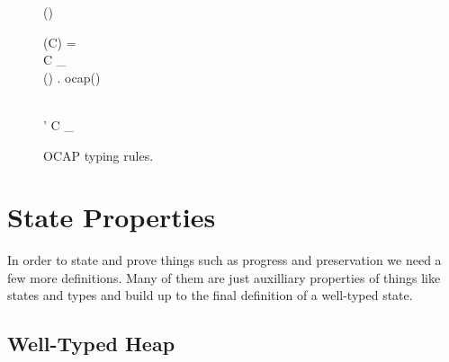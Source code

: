 \begin{figure}
  {\ocap{(\AnyRefType{})}}

  \RuleSpace{}

  {\ocap(\CellType)}

  \RuleSpace{}

  { 
  \classdef(C) =  \\
   \andalso C \vdash_{\ocap}  \\
  \forall () \in {}. \: ocap(\sigma)
  }
  {}

  \RuleSpace{}

  { \\
  \tau' \stof \tau}
  {C \vdash_{\ocap} }
  \caption{\RACL{} OCAP typing rules.}
  \label{fig:ocap_typing}
\end{figure}


\section{State Properties}
\label{sec:properties}

In order to state and prove things such as progress and preservation we need a few more
definitions. Many of them are just auxilliary properties of things like states
and types and build up to the final definition of a well-typed state.

\subsection{Well-Typed Heap}%
\label{sub:well_typed_heap}

